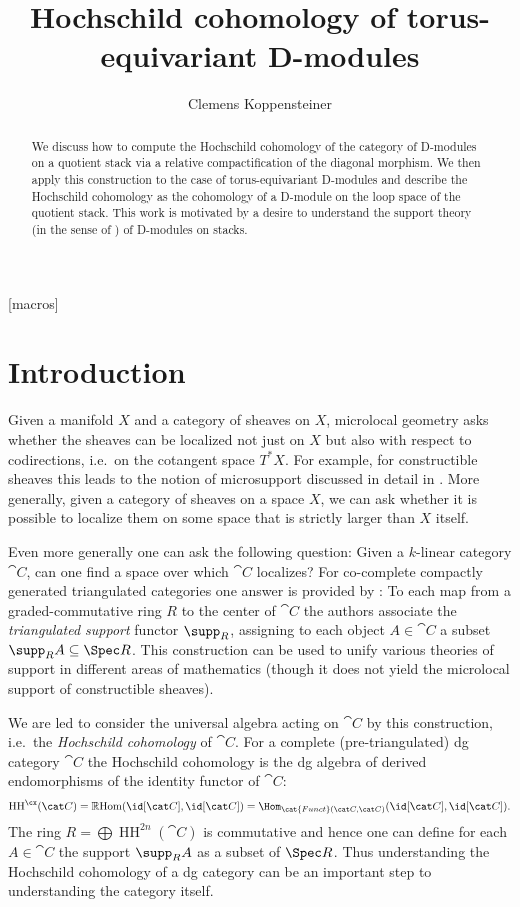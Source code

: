 \documentclass[english]{ck-article}
\title{Hochschild cohomology of torus-equivariant D-modules}
\author{Clemens Koppensteiner}
\newcommand{\HCoh}{\operatorname{HH}^\cx}
\begin{document}
\maketitle

[macros]

\begin{abstract}
    We discuss how to compute the Hochschild cohomology of the category of D-modules on a quotient stack via a relative compactification of the diagonal morphism.
    We then apply this construction to the case of torus-equivariant D-modules and describe the Hochschild cohomology as the cohomology of a D-module on the loop space of the quotient stack.
    This work is motivated by a desire to understand the support theory (in the sense of \cite{BensonIyengarKrause:2008:LocalCohomologyAndSupportForTriangulatedCategories}) of D-modules on stacks.
\end{abstract}

\setcounter{tocdepth}{1}
\tableofcontents

\section{Introduction}

Given a manifold $X$ and a category of sheaves on $X$, microlocal geometry asks whether the sheaves can be localized not just on $X$ but also with respect to codirections, i.e.~on the cotangent space $T^*X$.
For example, for constructible sheaves this leads to the notion of microsupport discussed in detail in \cite{KashiwaraSchapira:1994:SheavesOnManifolds}.
More generally, given a category of sheaves on a space $X$, we can ask whether it is possible to localize them on some space that is strictly larger than $X$ itself.

Even more generally one can ask the following question: Given a $k$-linear category $\cat C$, can one find a space over which $\cat C$ localizes?
For co-complete compactly generated triangulated categories one answer is provided by \cite{BensonIyengarKrause:2008:LocalCohomologyAndSupportForTriangulatedCategories}:
To each map from a graded-commutative ring $R$ to the center of $\cat C$ the authors associate the \emph{triangulated support} functor $\supp_R$, assigning to each object $A ∈ \cat C$ a subset $\supp_R A \subseteq \Spec R$.
This construction can be used to unify various theories of support in different areas of mathematics (though it does not yield the microlocal support of constructible sheaves).

We are led to consider the universal algebra acting on $\cat C$ by this construction, i.e.~the \emph{Hochschild cohomology} of $\cat C$.
For a complete (pre-triangulated) dg category $\cat C$ the Hochschild cohomology is the dg algebra of derived endomorphisms of the identity functor of $\cat C$:
\[
    \HCoh(\cat C)
    = \mathbb{R}\mathrm{Hom}(\id[\cat C], \id[\cat C])
    = \Hom_{\cat{Funct}(\cat C, \cat C)}(\id[\cat C], \id[\cat C]).
\]
The ring $R = \bigoplus \operatorname{HH}^{2n}(\cat C)$ is commutative and hence one can define for each $A ∈ \cat C$ the support $\supp_R A$ as a subset of $\Spec R$.
Thus understanding the Hochschild cohomology of a dg category can be an important step to understanding the category itself.
\end{document}
